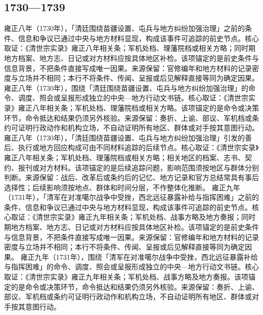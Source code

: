 \subsection{1730—1739}
雍正八年（1730年），「清廷围绕苗疆设置、屯兵与地方纠纷加强治理」之前的条件、信息和争议已通过中央与地方材料显现，构成该事件可追踪的前史节点。核心取证：《清世宗实录》雍正八年相关条；军机处档、理藩院档或相关方略；同时期地方档案、地方志、日记或对方材料应按具体地区补检。该项锚定的是前史条件与信息背景，不把条件直接写成唯一因果。来源保留：官修编年和地方材料的记录密度与立场并不相同；本行不将条件、传闻、呈报或后见解释直接等同为确定因果。
雍正八年（1730年），围绕「清廷围绕苗疆设置、屯兵与地方纠纷加强治理」的命令、调度、照会或呈报形成独立的中央—地方行动文书链。核心取证：《清世宗实录》雍正八年相关条；军机处档、理藩院档或相关方略。该项锚定的是命令或决策环节，命令抵达和结果仍须另外核验。来源保留：奏折、上谕、部议、军机档或条约可证明行政动作和机构立场，不自动证明所有地区、群体或对手按其意图行动。
雍正八年（1730年），「清廷围绕苗疆设置、屯兵与地方纠纷加强治理」引发的善后、执行或地方回应构成可由不同材料追踪的后续节点。核心取证：《清世宗实录》雍正八年相关条；军机处档、理藩院档或相关方略；相关地区的档案、志书、契约、报刊或对方材料。该项锚定的是后续追踪问题，影响范围须按地区与群体分别判断。来源保留：战后、改革后或条约后的记忆、地方记录和官方总结常具有事后选择性；后续影响须按地点、群体和时间分层，不作整体化推断。
雍正九年（1731年），「清军在对准噶尔战争中受挫，西北远征暴露补给与指挥困难」之前的条件、信息和争议已通过中央与地方材料显现，构成该事件可追踪的前史节点。核心取证：《清世宗实录》雍正九年相关条；军机处档、战事方略及地方奏报；同时期地方档案、地方志、日记或对方材料应按具体地区补检。该项锚定的是前史条件与信息背景，不把条件直接写成唯一因果。来源保留：官修编年和地方材料的记录密度与立场并不相同；本行不将条件、传闻、呈报或后见解释直接等同为确定因果。
雍正九年（1731年），围绕「清军在对准噶尔战争中受挫，西北远征暴露补给与指挥困难」的命令、调度、照会或呈报形成独立的中央—地方行动文书链。核心取证：《清世宗实录》雍正九年相关条；军机处档、战事方略及地方奏报。该项锚定的是命令或决策环节，命令抵达和结果仍须另外核验。来源保留：奏折、上谕、部议、军机档或条约可证明行政动作和机构立场，不自动证明所有地区、群体或对手按其意图行动。
